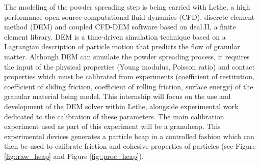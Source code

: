 \documentclass[12pt]{article}
\begin{document}
\noindent The modeling of the powder spreading step is being carried with Lethe, a high performance open-source 
computational fluid dynamics (CFD), discrete element method (DEM) and coupled CFD-DEM software
based on deal.II, a finite element library. DEM is a time-driven simulation technique based on 
a Lagrangian description of particle motion that predicts the flow of granular matter. Although 
DEM can simulate the powder spreading process, it requires the input of the physical properties (Young modulus, Poisson ratio) 
and contact properties which must be calibrated from experiments (coefficient of restitution, coefficient of sliding friction, 
coefficient of rolling friction, surface energy) of the granular material being model. This internship will focus on the use and 
development of the DEM solver within Lethe, alongside experimental work dedicated to the calibration of these parameters. The main calibration experiment used as part of this experiment will be a granuheap. This experimental devices generates a particle heap in a controlled fashion which can then be used to calibrate friction and cohesive properties of particles (see Figure \ref{fig::raw_heap} and Figure \ref{fig::proc_heap}). 
\end{document}

